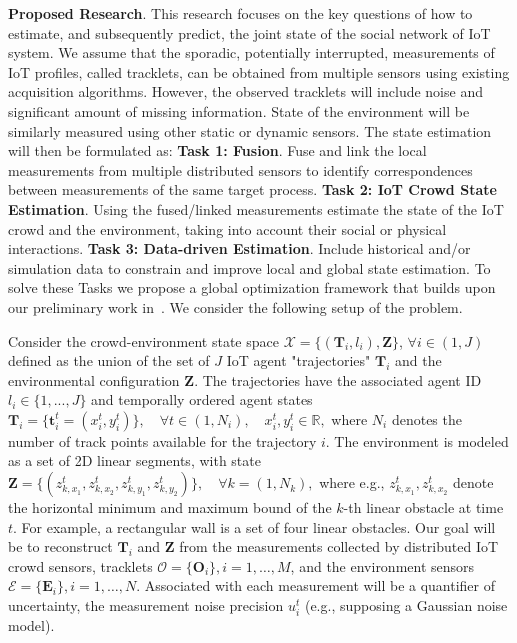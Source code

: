 {\bf Proposed Research}. This research focuses on the key questions of how to estimate, and subsequently predict, the joint state of the social network of IoT system.  %
We assume that the sporadic, potentially interrupted, measurements of IoT profiles, called tracklets, can be obtained from multiple sensors using existing acquisition algorithms. However, the observed tracklets will include noise and significant amount of missing information. State of the environment will be similarly measured using other static or dynamic sensors.  The state estimation will then be formulated as: {\bf Task 1: Fusion}.  Fuse and link the local measurements from multiple distributed sensors to identify correspondences between measurements of the same target process.  {\bf Task 2: IoT Crowd State Estimation}. Using the fused/linked measurements estimate the state of the IoT crowd and the environment, taking into account their social or physical interactions. {\bf Task 3: Data-driven Estimation}.  Include historical and/or simulation data to constrain and improve local and global state estimation.  To solve these Tasks we propose a global optimization framework that builds upon our preliminary work in~\cite{yoon2016}. We consider the following setup of the problem.

Consider the crowd-environment state space $\mathcal{X} = \{ ( \mathbf{T}_{i}, l_{i} ), \mathbf{Z} \}$, $\forall i \in (1, J)$  defined as the union of the set of $J$ IoT agent "trajectories" $\mathbf{T}_{i}$ and the environmental configuration $\mathbf{Z}$. The trajectories have the associated agent ID $l_{i} \in \{ 1, ... , J \}$ and temporally ordered agent states
$\mathbf{T}_{i} = \{ \mathbf{t}_{i}^{t} = (x_{i}^{t}, y_{i}^{t}) \},\quad \forall t \in (1, N_{i}),\quad x_{i}^{t}, y_{i}^{t} \in \mathbb{R},$ where $N_{i}$ denotes the number of track points available for the trajectory $i$. The environment is modeled as a set of 2D linear segments, with state $\mathbf{Z} = \{ (z_{k, x_1}^{t}, z_{k, x_2}^{t}, z_{k, y_1}^{t}, z_{k, y_2}^{t}) \},\quad \forall k=(1, N_{k}),$ where e.g., $z_{k,x_1}^{t}, z_{k,x_2}^{t}$ denote the horizontal minimum and maximum bound of the $k$-th linear obstacle at time $t$. For example, a rectangular wall is a set of four linear obstacles.  Our goal will be to reconstruct $\mathbf{T}_{i}$ and $\mathbf{Z}$ from the measurements collected by distributed IoT crowd sensors, tracklets $\mathcal{O} = \{ \mathbf{O}_i \}, i=1,\ldots,M$, and the environment sensors $\mathcal{E} = \{ \mathbf{E}_i \}, i=1,\ldots,N$. Associated with each measurement will be a quantifier of uncertainty, the measurement noise precision $u_{i}^{t}$ (e.g., supposing a Gaussian noise model). 

